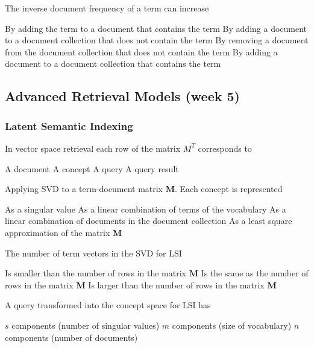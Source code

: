 \documentclass[12pt,a4paper,answers]{exam} %
\newcommand{\mat}[1]{\ensuremath{\textbf{#1}}}
\begin{document}
\begin{flushleft}
\begin{multicols*}{2}
\begin{questions}
\question The inverse document frequency of a term can increase
\begin{checkboxes}
\choice By adding the term to a document that contains the term
\CorrectChoice By adding a document to a document collection that does not
contain the term
\choice By removing a document from the document collection that
does not contain the term
\choice By adding a document to a document collection that contains
the term
\end{checkboxes}


\subsection{Advanced Retrieval Models (week 5)} %

\subsubsection{Latent Semantic Indexing}


\question In vector space retrieval each row of the matrix $M^T$ corresponds to
\begin{checkboxes}
\CorrectChoice A document
\choice A concept
\choice A query
\choice A query result
\end{checkboxes}

\question Applying SVD to a term-document matrix \mat{M}. Each concept is represented
\begin{checkboxes}
\choice As a singular value
\CorrectChoice As a linear combination of terms of the vocabulary
\choice As a linear combination of documents in the document collection
\choice As a least square approximation of the matrix \mat{M}
\end{checkboxes}

\question The number of term vectors in the SVD for LSI
\begin{checkboxes}
\choice Is smaller than the number of rows in the matrix \mat{M}
\CorrectChoice Is the same as the number of rows in the matrix \mat{M}
\choice Is larger than the number of rows in the matrix \mat{M}
\end{checkboxes}

\question A query transformed into the concept space for LSI has
\begin{checkboxes}
\CorrectChoice $s$ components (number of singular values)
\choice $m$ components (size of vocabulary)
\choice $n$ components (number of documents)
\end{checkboxes}


\end{questions}
\end{multicols*}
\end{flushleft}
\end{document}
